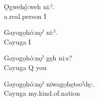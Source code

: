 \ea 
\gll Ǫgwehǫ́:weh ni:ˀ.\\
a.real.person I\\
\glt {}
\z 

\ea 
\gll Gayogo̱hó:nǫˀ ni:ˀ.\\
Cayuga I\\
\glt {}
\z 

\ea 
\gll Gayogo̱hó:nǫˀ gęh ni:s?\\
Cayuga Q you\\
\glt {}
\z

\ea 
\gll Gayogo̱hó:nǫˀ niwago̱hętsoˀdę:.\\
Cayuga my.kind.of.nation\\
\glt {}
\z

